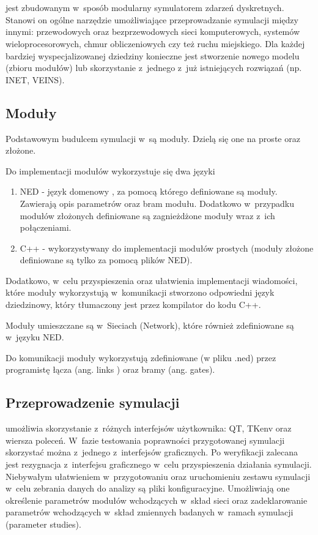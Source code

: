\section{\omnetpp}
\omnetpp jest zbudowanym w~sposób modularny symulatorem zdarzeń dyskretnych. Stanowi on ogólne narzędzie umożliwiające przeprowadzanie symulacji między innymi: przewodowych oraz bezprzewodowych sieci komputerowych, systemów wieloprocesorowych, chmur obliczeniowych czy też ruchu miejskiego. Dla każdej bardziej wyspecjalizowanej dziedziny konieczne jest stworzenie nowego modelu (zbioru modułów) lub skorzystanie z~jednego z~już istniejących rozwiązań (np. INET, VEINS).\cite{Varga2017}
\subsection{Moduły}
Podstawowym budulcem symulacji w~\omnetpp są moduły. Dzielą się one na proste oraz złożone.

Do implementacji modułów wykorzystuje się dwa języki
\begin{enumerate}
	\item NED - język domenowy \omnetpp, za pomocą którego definiowane są moduły. Zawierają opis parametrów oraz bram modułu. Dodatkowo w~przypadku modułów złożonych definiowane są zagnieżdżone moduły wraz z~ich połączeniami.
	\item C++ - wykorzystywany do implementacji modułów prostych (moduły złożone definiowane są tylko za pomocą plików NED).
\end{enumerate}
Dodatkowo, w~celu przyspieszenia oraz ułatwienia implementacji wiadomości, które moduły wykorzystują w~komunikacji stworzono odpowiedni język dziedzinowy, który tłumaczony jest przez kompilator do kodu C++.

Moduły umieszczane są w~Sieciach (Network), które również zdefiniowane są w~języku NED.

Do komunikacji moduły wykorzystują zdefiniowane (w pliku .ned) przez programistę łącza (ang. links ) oraz bramy (ang. gates).
\subsection{Przeprowadzenie symulacji}
\omnetpp umożliwia skorzystanie z~różnych interfejsów użytkownika: QT, TKenv oraz wiersza poleceń. W~fazie testowania poprawności przygotowanej symulacji skorzystać można z~jednego z~interfejsów graficznych. Po weryfikacji zalecana jest rezygnacja z~interfejsu graficznego w~celu przyspieszenia działania symulacji. Niebywałym ułatwieniem w~przygotowaniu oraz uruchomieniu zestawu symulacji w~celu zebrania danych do analizy są pliki konfiguracyjne. Umożliwiają one określenie parametrów modułów wchodzących w~skład sieci oraz zadeklarowanie parametrów wchodzących w~skład zmiennych badanych w~ramach symulacji (parameter studies).
